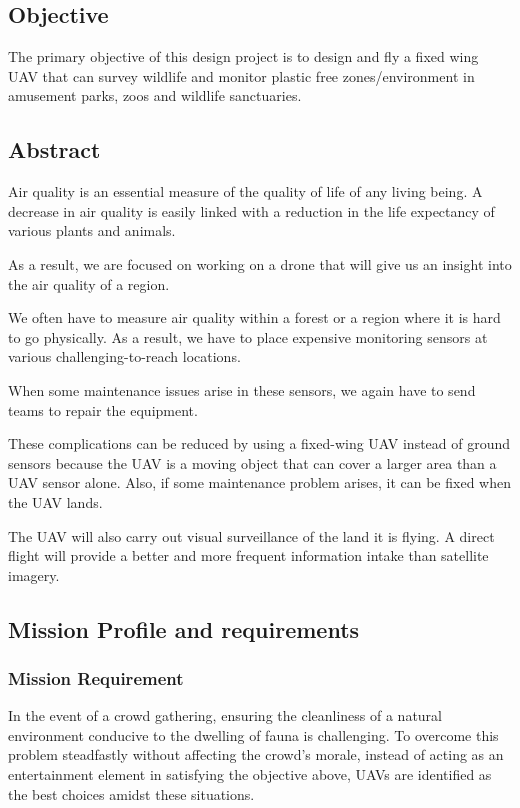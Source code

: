 \documentclass[12 pt]{article}
\begin{document}
\subsection{Objective}
The primary objective of this design project is to design and fly a fixed wing UAV that can survey wildlife and monitor plastic free zones/environment in amusement parks, zoos and wildlife sanctuaries.


\subsection{Abstract}
Air quality is an essential measure of the quality of life of any living being. A decrease in air quality is easily linked with a reduction in the life expectancy of various plants and animals.

As a result, we are focused on working on a drone that will give us an insight into the air quality of a region. 

We often have to measure air quality within a forest or a region where it is hard to go physically. As a result, we have to place expensive monitoring sensors at various challenging-to-reach locations. 

When some maintenance issues arise in these sensors, we again have to send teams to repair the equipment.

These complications can be reduced by using a fixed-wing UAV instead of ground sensors because the UAV is a moving object that can cover a larger area than a UAV sensor alone. Also, if some maintenance problem arises, it can be fixed when the UAV lands.

The UAV will also carry out visual surveillance of the land it is flying. A direct flight will provide a better and more frequent information intake than satellite imagery.

\subsection{Mission Profile and requirements}

\subsubsection{Mission Requirement}
In the event of a crowd gathering, ensuring the cleanliness of a natural environment conducive to the dwelling of fauna is challenging. To overcome this problem steadfastly without affecting the crowd's morale, instead of acting as an entertainment element in satisfying the objective above, UAVs are identified as the best choices amidst these situations. 
\end{document}
